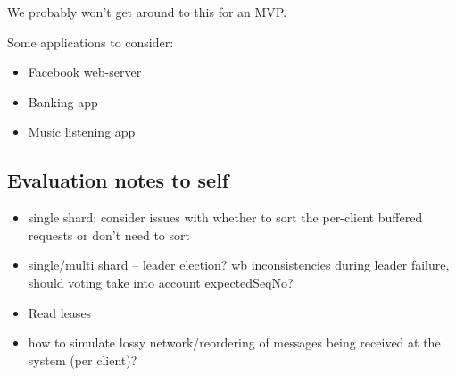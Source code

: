 We probably won't get around to this for an MVP.

Some applications to consider:
\begin{itemize}
    \item Facebook web-server
    \item Banking app
    \item Music listening app
\end{itemize}
\subsection{Evaluation notes to self}
\begin{itemize}
    \item single shard: consider issues with whether to sort the per-client buffered requests or don't need to sort
    \item single/multi shard -- leader election? wb inconsistencies during leader failure, should voting take into account expectedSeqNo?
    \item Read leases
    \item how to simulate lossy network/reordering of messages being received at the system (per client)?
\end{itemize}
